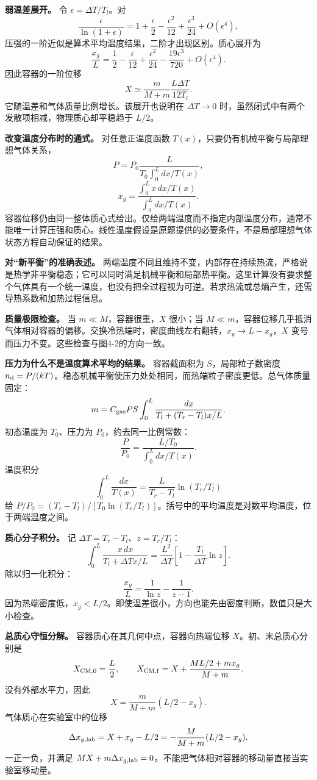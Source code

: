 \documentclass[12pt,a4paper,UTF8]{ctexart}
\begin{document}
\textbf{弱温差展开。} 令 \(\epsilon=\Delta T/T_l\)。对 \[
\frac{\epsilon}{\ln(1+\epsilon)}
=1+\frac\epsilon2-\frac{\epsilon^2}{12}
+\frac{\epsilon^3}{24}+O(\epsilon^4),
\] 压强的一阶近似是算术平均温度结果，二阶才出现区别。质心展开为 \[
\frac{x_g}{L}
=\frac12-\frac{\epsilon}{12}
+\frac{\epsilon^2}{24}
-\frac{19\epsilon^3}{720}+O(\epsilon^4).
\] 因此容器的一阶位移 \[
X\simeq\frac m{M+m}\frac{L\Delta T}{12T_l}.
\] 它随温差和气体质量比例增长。该展开也说明在 \(\Delta T\to0\)
时，虽然闭式中有两个发散项相减，物理质心却平稳趋于 \(L/2\)。

\textbf{改变温度分布时的通式。} 对任意正温度函数
\(T(x)\)，只要仍有机械平衡与局部理想气体关系， \[
P=P_0\frac{L}{T_0\int_0^L dx/T(x)},
\] \[
x_g=\frac{\int_0^Lx\,dx/T(x)}
{\int_0^Ldx/T(x)}.
\]
容器位移仍由同一整体质心式给出。仅给两端温度而不指定内部温度分布，通常不能唯一计算压强和质心。线性温度假设是原题提供的必要条件，不是局部理想气体状态方程自动保证的结果。

\textbf{对``新平衡''的准确表述。}
两端温度不同且维持不变，内部存在持续热流，严格说是热学非平衡稳态；它可以同时满足机械平衡和局部热平衡。这里计算没有要求整个气体具有一个统一温度，也没有把全过程视为可逆。若求热流或总熵产生，还需导热系数和加热过程信息。

\textbf{质量极限检查。} 当 \(m\ll M\)，容器很重，\(X\) 很小；当
\(M\ll m\)，容器位移几乎抵消气体相对容器的偏移。交换冷热端时，密度曲线左右翻转，\(x_g\to L-x_g\)，\(X\)
变号而压力不变。这些检查与图4-2的方向一致。

\textbf{压力为什么不是温度算术平均的结果。} 容器截面积为
\(S\)，局部粒子数密度
\(n_{\rm d}=P/(kT)\)。稳态机械平衡使压力处处相同，而热端粒子密度更低。总气体质量固定：
\[
m=C_{\rm gas}P S\int_0^L\frac{dx}{T_l+(T_r-T_l)x/L}.
\] 初态温度为 \(T_0\)、压力为 \(P_0\)，约去同一比例常数： \[
\frac{P}{P_0}=\frac{L/T_0}{\int_0^L dx/T(x)}.
\] 温度积分 \[
\int_0^L\frac{dx}{T(x)}
=\frac{L}{T_r-T_l}\ln(T_r/T_l)
\] 给
\(P/P_0=(T_r-T_l)/[T_0\ln(T_r/T_l)]\)。括号中的平均温度是对数平均温度，位于两端温度之间。

\textbf{质心分子积分。} 记 \(\Delta T=T_r-T_l\)、\(z=T_r/T_l\)： \[
\int_0^L\frac{x\,dx}{T_l+\Delta T x/L}
=\frac{L^2}{\Delta T}
\left[1-\frac{T_l}{\Delta T}\ln z\right].
\] 除以归一化积分： \[
\frac{x_g}{L}=\frac1{\ln z}-\frac1{z-1}.
\]
因为热端密度低，\(x_g<L/2\)。即使温差很小，方向也能先由密度判断，数值只是大小检查。

\textbf{总质心守恒分解。} 容器质心在其几何中点，容器向热端位移
\(X\)。初、末总质心分别是 \[
X_{\rm CM,0}=\frac L2,\qquad
X_{\rm CM,f}=X+\frac{ML/2+mx_g}{M+m}.
\] 没有外部水平力，因此 \[
X=\frac{m}{M+m}(L/2-x_g).
\] 气体质心在实验室中的位移 \[
\Delta x_{g,\rm lab}=X+x_g-L/2
=-\frac{M}{M+m}(L/2-x_g).
\] 一正一负，并满足
\(MX+m\Delta x_{g,\rm lab}=0\)。不能把气体相对容器的移动量直接当实验室移动量。
\end{document}
